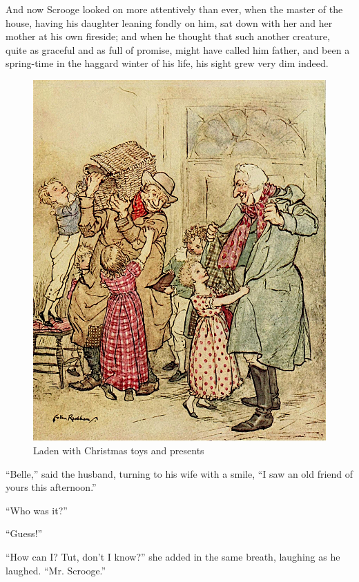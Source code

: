 \documentclass[paper=5.5in:8.5in,BCOR=15mm,twoside,DIV=15,headinclude=off,12pt,chapterprefix=off,openany,headings=huge]{scrbook} %
\begin{document}
And now Scrooge looked on more attentively than ever, when the master of the house, having his daughter leaning fondly on him, sat down with her and her mother at his own fireside; and when he thought that such another creature, quite as graceful and as full of promise, might have called him father, and been a spring-time in the haggard winter of his life, his sight grew very dim indeed.

\begin{figure}[p]
\begin{minipage}[c]{\linewidth}
\includegraphics[width=\linewidth]{prezziesimproved}
\caption*{Laden with Christmas toys and presents}
\end{minipage}
\end{figure}

\enquote{Belle,} said the husband, turning to his wife with a smile, \enquote{I saw an old friend of yours this afternoon.}

\enquote{Who was it?}

\enquote{Guess!}

\enquote{How can I? Tut, don't I know?} she added in the same breath, laughing as he laughed. \enquote{Mr. Scrooge.}
\end{document}
